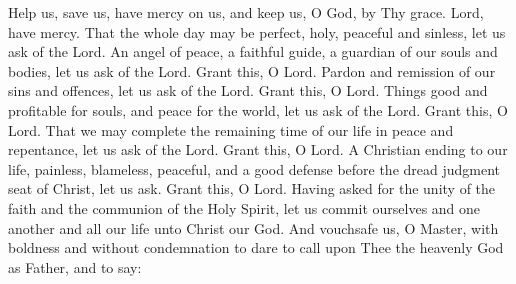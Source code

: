 \begin{liturgicaltext}
    \deacon Help us, save us, have mercy on us, and keep us, O God, by Thy grace.
    \choir Lord, have mercy.
    \deacon That the whole day may be perfect, holy, peaceful and sinless, let us ask of the Lord. 
    \choir {}
    \deacon An angel of peace, a faithful guide, a guardian of our souls and bodies, let us ask of the Lord.
    \choir Grant this, O Lord.
    \deacon Pardon and remission of our sins and offences, let us ask of the Lord.
    \choir Grant this, O Lord.
    \deacon Things good and profitable for souls, and peace for the world, let us ask of the Lord. 
    \choir Grant this, O Lord.
    \deacon That we may complete the remaining time of our life in peace and repentance, let us ask of the Lord. 
    \choir Grant this, O Lord.
    \deacon A Christian ending to our life, painless, blameless, peaceful, and a good defense before the dread judgment seat of Christ, let us ask. 
    \choir Grant this, O Lord.
    \deacon Having asked for the unity of the faith and the communion of the Holy Spirit, let us commit ourselves and one another and all our life unto Christ our God.
    \choir {}
    \priest And vouchsafe us, O Master, with boldness and without condemnation to dare to call upon Thee the heavenly God as Father, and to say:
\end{liturgicaltext}


